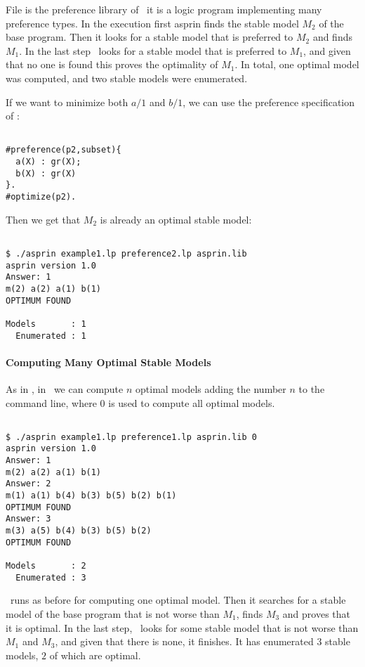 File  is the preference library of \asprin\, it is a logic program implementing many preference types.
In the execution first asprin finds the stable model $M_2$ of the base program. Then it looks for a stable model that is preferred to $M_2$ and finds $M_1$. 
In the last step \asprin\ looks for a stable model that is preferred to $M_1$,  and given that no one is found this proves the optimality of $M_1$. 
In total, one optimal model was computed, and two stable models were enumerated. 

If we want to minimize both $a/1$ and $b/1$, we can use the preference specification of : 
\begin{verbatim}

#preference(p2,subset){                                                                                             
  a(X) : gr(X);                                                                                                   
  b(X) : gr(X)                                                                                                    
}.
#optimize(p2).
\end{verbatim}
Then we get that $M_2$ is already an optimal stable model: 
\begin{verbatim}

$ ./asprin example1.lp preference2.lp asprin.lib
asprin version 1.0
Answer: 1
m(2) a(2) a(1) b(1)
OPTIMUM FOUND

Models       : 1
  Enumerated : 1
\end{verbatim}

\paragraph{Computing Many Optimal Stable Models}
As in \clingo, in \asprin\  we can compute $n$ optimal models adding the number $n$ to the command line,  where $0$ is used to compute all optimal models. 
\begin{verbatim}

$ ./asprin example1.lp preference1.lp asprin.lib 0
asprin version 1.0
Answer: 1
m(2) a(2) a(1) b(1)
Answer: 2
m(1) a(1) b(4) b(3) b(5) b(2) b(1)
OPTIMUM FOUND
Answer: 3
m(3) a(5) b(4) b(3) b(5) b(2)
OPTIMUM FOUND

Models       : 2
  Enumerated : 3

\end{verbatim}
\asprin\ runs as before for computing one optimal model. Then it searches for a stable model of the base program that is not worse than $M_1$, finds $M_3$ and proves that it is optimal. 
In the last step, \asprin\ looks for some stable model that is not worse than $M_1$ and $M_3$,  and given that there is none, it finishes. 
It has enumerated $3$ stable models, $2$ of which are optimal. 

